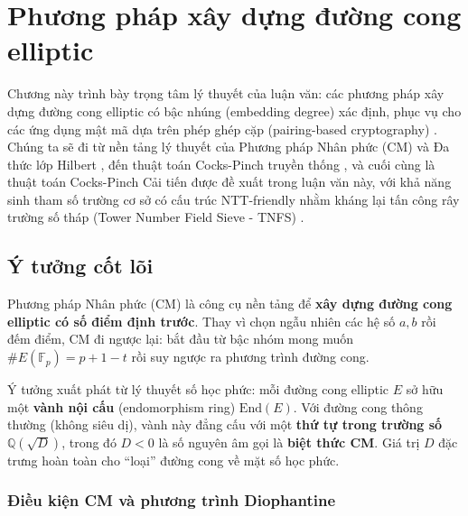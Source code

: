 
\clearpage
{}

\setcounter{chapter}{2}
\chapter[Phương pháp xây dựng đường cong elliptic]{Phương pháp xây dựng
đường cong elliptic}

Chương này trình bày trọng tâm lý thuyết của luận văn: các phương pháp
xây dựng đường cong elliptic có bậc nhúng (embedding degree) xác định,
phục vụ cho các ứng dụng mật mã dựa trên phép ghép cặp (pairing-based
cryptography) \citep{MoonMath}. Chúng ta sẽ đi từ nền tảng lý thuyết của
Phương pháp Nhân phức (CM) và Đa thức lớp Hilbert \citep{Silverman2009},
đến thuật toán Cocks-Pinch truyền thống \citep{CocksPinch2001}, và cuối
cùng là thuật toán Cocks-Pinch Cải tiến được đề xuất trong luận văn này,
với khả năng sinh tham số trường cơ sở có cấu trúc NTT-friendly nhằm
kháng lại tấn công rây trường số tháp (Tower Number Field Sieve - TNFS)
\citep{BarbulescuDuquesne2019}.

\section{Ý tưởng cốt lõi}\label{uxfd-tux1b0ux1edfng-cux1ed1t-luxf5i}

Phương pháp Nhân phức (CM) là công cụ nền tảng để \textbf{xây dựng đường
cong elliptic có số điểm định trước}. Thay vì chọn ngẫu nhiên các hệ số
\(a, b\) rồi đếm điểm, CM đi ngược lại: bắt đầu từ bậc nhóm mong muốn
\(\#E(\mathbb{F}_p) = p + 1 - t\) rồi suy ngược ra phương trình đường
cong.

Ý tưởng xuất phát từ lý thuyết số học phức: mỗi đường cong elliptic
\(E\) sở hữu một \textbf{vành nội cấu} (endomorphism ring)
\(\text{End}(E)\). Với đường cong thông thường (không siêu dị), vành này
đẳng cấu với một \textbf{thứ tự trong trường số}
\(\mathbb{Q}(\sqrt{D})\), trong đó \(D < 0\) là số nguyên âm gọi là
\textbf{biệt thức CM}. Giá trị \(D\) đặc trưng hoàn toàn cho ``loại''
đường cong về mặt số học phức.

\subsection{Điều kiện CM và phương trình
Diophantine}\label{ux111iux1ec1u-kiux1ec7n-cm-vuxe0-phux1b0ux1a1ng-truxecnh-diophantine}

